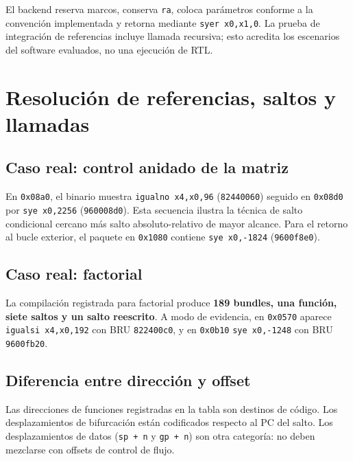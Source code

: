 El backend reserva marcos, conserva \texttt{ra}, coloca
parámetros conforme a la convención implementada y retorna mediante
\texttt{syer x0,x1,0}. La prueba de integración de
referencias incluye llamada recursiva; esto acredita los escenarios del
software evaluados, no una ejecución de RTL.

\section{Resolución de referencias, saltos y
llamadas}\label{7-resoluciuxf3n-de-referencias-saltos-y-llamadas}

\subsection{Caso real: control anidado de la
matriz}\label{71-caso-real-control-anidado-de-la-matriz}

En \texttt{0x08a0}, el binario muestra
\texttt{igualno x4,x0,96}
(\texttt{82440060}) seguido en
\texttt{0x08d0} por
\texttt{sye x0,2256}
(\texttt{960008d0}). Esta secuencia ilustra la técnica
de salto condicional cercano más salto absoluto-relativo de mayor
alcance. Para el retorno al bucle exterior, el paquete en
\texttt{0x1080} contiene
\texttt{sye x0,-1824}
(\texttt{9600f8e0}).

\subsection{Caso real: factorial}\label{72-caso-real-factorial}

La compilación registrada para factorial produce \textbf{189 bundles,
una función, siete saltos y un salto reescrito}. A modo de evidencia, en
\texttt{0x0570} aparece
\texttt{igualsi x4,x0,192} con BRU
\texttt{822400c0}, y en
\texttt{0x0b10} \texttt{sye x0,-1248}
con BRU \texttt{9600fb20}.

\subsection{Diferencia entre dirección y
offset}\label{73-diferencia-entre-direcciuxf3n-y-offset}

Las direcciones de funciones registradas en la tabla son destinos de
código. Los desplazamientos de bifurcación están codificados respecto al
PC del salto. Los desplazamientos de datos
(\texttt{sp + n} y \texttt{gp + n})
son otra categoría: no deben mezclarse con offsets de control de flujo.

